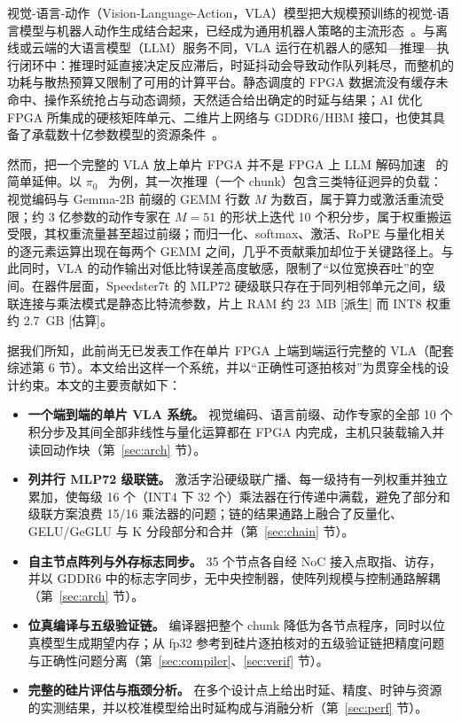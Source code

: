 \documentclass[a4paper,10.5pt]{ctexart}
\newcommand{\tD}{\textsf{[派生]}}           %
\newcommand{\tE}{\textsf{[估算]}}           %
\newcommand{\pizero}{$\pi_0$}
\begin{document}
视觉-语言-动作（Vision-Language-Action，VLA）模型把大规模预训练的视觉-语言模型与机器人动作生成结合起来，已经成为通用机器人策略的主流形态~\cite{rt2,openvla,pi0,pi05}。与离线或云端的大语言模型（LLM）服务不同，VLA 运行在机器人的感知—推理—执行闭环中：推理时延直接决定反应滞后，时延抖动会导致动作队列耗尽，而整机的功耗与散热预算又限制了可用的计算平台。静态调度的 FPGA 数据流没有缓存未命中、操作系统抢占与动态调频，天然适合给出确定的时延与结果；AI 优化 FPGA 所集成的硬核矩阵单元、二维片上网络与 GDDR6/HBM 接口，也使其具备了承载数十亿参数模型的资源条件~\cite{achronix,s10nx_fpga21,versal_fpga19}。

然而，把一个完整的 VLA 放上单片 FPGA 并不是 FPGA 上 LLM 解码加速~\cite{flightllm,dfx,edgellm} 的简单延伸。以 \pizero~\cite{pi0} 为例，其一次推理（一个 chunk）包含三类特征迥异的负载：视觉编码与 Gemma-2B 前缀的 GEMM 行数 $M$ 为数百，属于算力或激活重流受限；约 3 亿参数的动作专家在 $M=51$ 的形状上迭代 10 个积分步，属于权重搬运受限，其权重流量甚至超过前缀；而归一化、softmax、激活、RoPE 与量化相关的逐元素运算出现在每两个 GEMM 之间，几乎不贡献乘加却位于关键路径上。与此同时，VLA 的动作输出对低比特误差高度敏感，限制了“以位宽换吞吐”的空间。在器件层面，Speedster7t 的 MLP72 硬级联只存在于同列相邻单元之间，级联连接与乘法模式是静态比特流参数，片上 RAM 约 23~MB \tD{} 而 INT8 权重约 2.7~GB \tE。

据我们所知，此前尚无已发表工作在单片 FPGA 上端到端运行完整的 VLA（配套综述第 6 节）。本文给出这样一个系统，并以“正确性可逐拍核对”为贯穿全栈的设计约束。本文的主要贡献如下：
\begin{itemize}
  \item \textbf{一个端到端的单片 VLA 系统。} 视觉编码、语言前缀、动作专家的全部 10 个积分步及其间全部非线性与量化运算都在 FPGA 内完成，主机只装载输入并读回动作块（第~\ref{sec:arch} 节）。
  \item \textbf{列并行 MLP72 级联链。} 激活字沿硬级联广播、每一级持有一列权重并独立累加，使每级 16 个（INT4 下 32 个）乘法器在行传递中满载，避免了部分和级联方案浪费 15/16 乘法器的问题；链的结果通路上融合了反量化、GELU/GeGLU 与 K 分段部分和合并（第~\ref{sec:chain} 节）。
  \item \textbf{自主节点阵列与外存标志同步。} 35 个节点各自经 NoC 接入点取指、访存，并以 GDDR6 中的标志字同步，无中央控制器，使阵列规模与控制通路解耦（第~\ref{sec:arch} 节）。
  \item \textbf{位真编译与五级验证链。} 编译器把整个 chunk 降低为各节点程序，同时以位真模型生成期望内存；从 fp32 参考到硅片逐拍核对的五级验证链把精度问题与正确性问题分离（第~\ref{sec:compiler}、\ref{sec:verif} 节）。
  \item \textbf{完整的硅片评估与瓶颈分析。} 在多个设计点上给出时延、精度、时钟与资源的实测结果，并以校准模型给出时延构成与消融分析（第~\ref{sec:perf} 节）。
\end{itemize}
\end{document}
